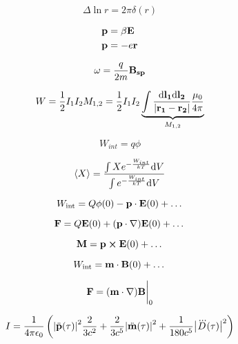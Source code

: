 \documentclass[11pt,twoside]{article}
\begin{document}
\begin{multicols}{3}
\begin{equation}
\Delta \ln r = 2\pi \delta(r)
\end{equation}

\begin{equation}
\begin{split}
\vb{p} &= \beta \vb{E} \\
\vb{p} &= -e\vb{r}
\end{split}
\end{equation}

\begin{equation}
\omega = \frac{q}{2m}\vb{B_{sp}}
\end{equation}

\begin{equation}
W=\frac{1}{2}I_1I_2M_{1,2} = \frac{1}{2}I_1I_2 \underbrace{\int \frac{\dd \vb{l_1} \dd \vb{l_2}}{|\vb{r_1} - \vb{r_2}|} \frac{\mu_0}{4\pi}}_{M_{1,2}}
\end{equation}

\begin{equation}
W_{int}=q\phi
\end{equation}

\begin{equation}
\expval{X} = \frac{\int X e^{-\frac{W_{int}}{kT}}\dd V}{\int e^{-\frac{W_{int}}{kT}}\dd V}
\end{equation}

\begin{equation}
W_{\text{int}} = Q\phi(0)-\vb{p}\cdot \vb{E}(0)+\dots
\end{equation}

\begin{equation}
\vb{F} = Q\vb{E}(0)+(\vb{p}\cdot\nabla)\vb{E}(0)+\dots
\end{equation}

\begin{equation}
\vb{M} = \vb{p}\cross\vb{E}(0)+\dots
\end{equation}

\begin{equation}
W_{\text{int}} = \vb{m}\cdot\vb{B}(0)+\dots
\end{equation}

\begin{equation}
\vb{F}=(\vb{m}\cdot\nabla)\vb{B}\bigg|_0
\end{equation}

\begin{equation}
I=\frac{1}{4\pi\epsilon_0}\left(\abs{\ddot{\vb{p}}(\tau)}^2\frac{2}{3c^2} + \frac{2}{3c^5}\abs{\ddot{\vb{m}}(\tau)}^2+\frac{1}{180 c^5}\abs{\dddot{D}(\tau)}^2\right)
\end{equation}


\end{multicols}
\end{document}
